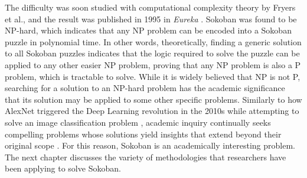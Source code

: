 The difficulty was soon studied with computational complexity theory by Fryers et al., and the result was published in 1995 in \textit{Eureka} \cite{fryers1995sokoban}. Sokoban was found to be NP-hard, which indicates that any NP problem can be encoded into a Sokoban puzzle in polynomial time. In other words, theoretically, finding a generic solution to all Sokoban puzzles indicates that the logic required to solve the puzzle can be applied to any other easier NP problem, proving that any NP problem is also a P problem, which is tractable to solve. While it is widely believed that NP is not P, searching for a solution to an NP-hard problem has the academic significance that its solution may be applied to some other specific problems. Similarly to how AlexNet triggered the Deep Learning revolution in the 2010s while attempting to solve an image classification problem \cite{krizhevsky2012imagenet}, academic inquiry continually seeks compelling problems whose solutions yield insights that extend beyond their original scope \cite{lecun2015deep}. For this reason, Sokoban is an academically interesting problem. The next chapter discusses the variety of methodologies that researchers have been applying to solve Sokoban.


